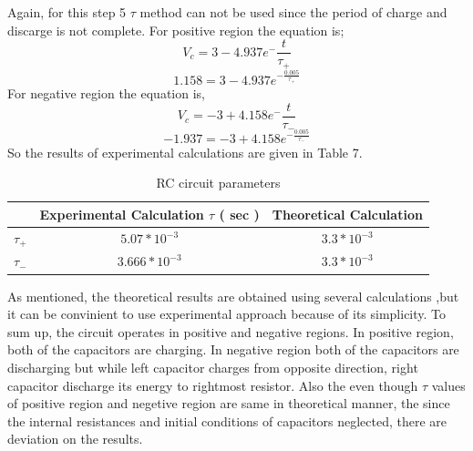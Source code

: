 \documentclass[letterpaper,12pt]{article}
\begin{document}
Again, for this step 5 \(\tau\) method can not be used since the period of charge and discarge is not complete.
For positive region the equation is;
\[V_c = 3 - 4.937e^-\frac{t}{\tau_+}\]
\[1.158 = 3 - 4.937e^{-\frac{0.005}{\tau_+}} \]
For negative region the equation is, 
\[V_c = -3 + 4.158e^-\frac{t}{\tau_-}\]
\[ -1.937 = - 3 + 4.158e^{-\frac{0.005}{\tau_-}} \]
So the results of experimental calculations are given in Table 7.
\begin{table}[H]
	\begin{center}
	\caption{RC circuit parameters}
	\vspace{2mm}
		\begin{tabular}{|| c | c |c ||} 
		 \hline
		  &Experimental Calculation \(\tau\) ( sec )& Theoretical Calculation \\ [0.5ex] 
		 \hline\hline
		 \(\tau_+\)&\(5.07*10^{-3}\)&\(3.3*10^{-3}\)    \\ 
	 \hline
	 \(\tau_-\)& \(3.666*10^{-3}\)& \(3.3*10^{-3}\) \\
	 \hline
\end{tabular}
\end{center}
\end{table}
As mentioned, the theoretical results are obtained using several calculations ,but it can be convinient to use experimental approach because of its simplicity. To sum up, the circuit operates in positive and negative regions. In positive region, both of the capacitors are charging. In negative region both of the capacitors are discharging but while left capacitor charges from opposite direction, right capacitor discharge its energy to rightmost resistor.  Also the  even though \(\tau\) values of positive region and negetive region are same in theoretical manner, the since the internal resistances and initial conditions of capacitors neglected, there are deviation on the results.

 
\end{document}
